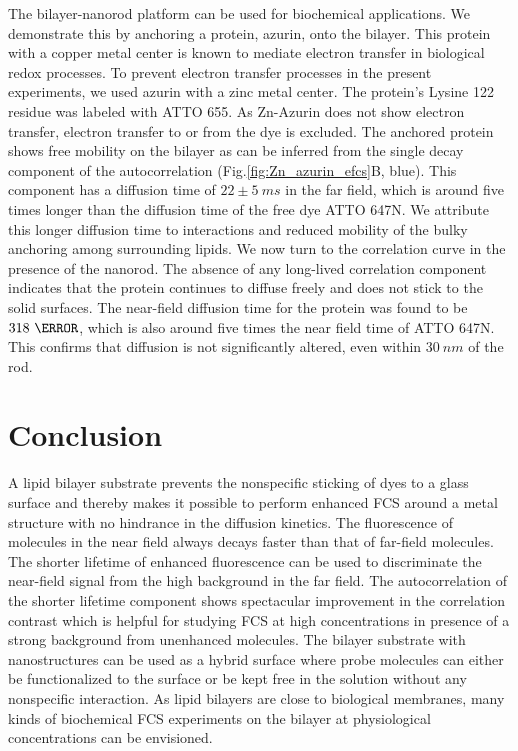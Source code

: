 The bilayer-nanorod platform can be used for biochemical applications. We demonstrate this by anchoring a protein, azurin, onto the bilayer. This protein with a copper metal center is known to mediate electron transfer in biological redox processes.\cite{kolczak2006azurin,Vijgenboom1997invivo} To prevent electron transfer processes in the present experiments, we used azurin with a zinc metal center. The protein's Lysine 122 residue was labeled with ATTO 655. As Zn-Azurin does not show electron transfer, electron transfer to or from the dye is excluded. The anchored protein shows free mobility on the bilayer as can be inferred from the single decay component of the autocorrelation (Fig.\ref{fig:Zn_azurin_efcs}B, blue). This component has a diffusion time of $22\pm5~ms$ in the far field, which is around five times longer than the diffusion time of the free dye ATTO 647N. We attribute this longer diffusion time to interactions and reduced mobility of the bulky anchoring among surrounding lipids. We now turn to the correlation curve in the presence of the nanorod. The absence of any long-lived correlation component indicates that the protein continues to diffuse freely and does not stick to the solid surfaces. The near-field diffusion time for the protein was found to be $318~\us$, which is also around five times the near field time of ATTO 647N. This confirms that diffusion is not significantly altered, even within $30~nm$ of the rod.\\
\section{Conclusion}
A lipid bilayer substrate prevents the nonspecific sticking of dyes to a glass surface and thereby makes it possible to perform enhanced FCS around a metal structure with no hindrance in the diffusion kinetics. The fluorescence of molecules in the near field always decays faster than that of far-field molecules. The shorter lifetime of enhanced fluorescence can be used to discriminate the near-field signal from the high background in the far field. The autocorrelation of the shorter lifetime component shows spectacular improvement in the correlation contrast which is helpful for studying FCS at high concentrations in presence of a strong background from unenhanced molecules. The bilayer substrate with nanostructures can be used as a hybrid surface where probe molecules can either be functionalized to the surface or be kept free in the solution without any nonspecific interaction. As lipid bilayers are close to biological membranes, many kinds of biochemical FCS experiments on the bilayer at physiological concentrations can be envisioned.\\
